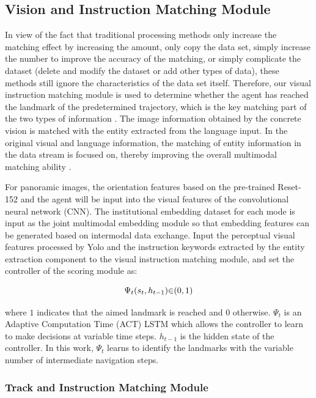 \subsection{Vision and Instruction Matching Module}
	
In view of the fact that traditional processing methods only increase the matching effect by increasing the amount, only copy the data set, simply increase the number to improve the accuracy of the matching, or simply complicate the dataset (delete and modify the dataset or add other types of data), these methods still ignore the characteristics of the data set itself. Therefore, our visual instruction matching module is used to determine whether the agent has reached the landmark of the predetermined trajectory, which is the key matching part of the two types of information \cite{vasudevan2021talk2nav}. The image information obtained by the concrete vision is matched with the entity extracted from the language input. In the original visual and language information, the matching of entity information in the data stream is focused on, thereby improving the overall multimodal matching ability \cite{zhao2021evaluation}.
	
For panoramic images, the orientation features based on the pre-trained Reset-152 and the agent will be input into the visual features of the convolutional neural network (CNN). The institutional embedding dataset for each mode is input as the joint multimodal embedding module so that embedding features can be generated based on intermodal data exchange. Input the perceptual visual features processed by Yolo and the instruction keywords extracted by the entity extraction component to the visual instruction matching module, and set the controller of the scoring module as:

\begin{equation}
	\centering
	{\Psi}_{t}({s}_{t},{h}_{t-1}){\in}{({0},{1})}
\end{equation}

where ${1}$ indicates that the aimed landmark is reached and ${0}$ otherwise. ${{\Psi}_{t}}$ is an Adaptive Computation Time (ACT) LSTM which allows the controller to learn to make decisions at variable time steps. ${h}_{t-1}$ is the hidden state of the controller. In this work, ${{\Psi}_{t}}$ learns to identify the landmarks with the variable number of intermediate navigation steps.

\subsubsection{Track and Instruction Matching Module}

